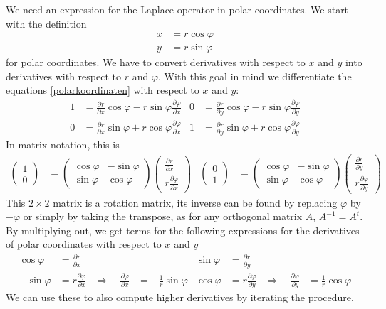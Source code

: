 We need an expression for the Laplace operator in polar coordinates.
We start with the definition
\begin{align}
x&=r\cos\varphi\\
y&=r\sin\varphi
\label{polarkoordinaten}
\end{align}
for polar coordinates.
We have to convert derivatives with respect to $x$ and $y$
into derivatives with respect to $r$ and $\varphi$.
With this goal in mind we differentiate the equations
\eqref{polarkoordinaten} with respect to $x$ and $y$:
\begin{align*}
1&=
\frac{\partial r}{\partial x}\cos\varphi
-r\sin\varphi \frac{\partial\varphi}{\partial x}
&
0&=
\frac{\partial r}{\partial y}\cos\varphi
-r\sin\varphi \frac{\partial\varphi}{\partial y}
\\
0&=
\frac{\partial r}{\partial x}\sin\varphi
+r\cos\varphi \frac{\partial\varphi}{\partial x}
&
1&=
\frac{\partial r}{\partial y}\sin\varphi
+r\cos\varphi \frac{\partial\varphi}{\partial y}
\end{align*}
In matrix notation, this is
\begin{align*}
\begin{pmatrix}1\\0\end{pmatrix}
&=
\begin{pmatrix}
\cos\varphi&-\sin\varphi\\
\sin\varphi&\cos\varphi
\end{pmatrix}
\begin{pmatrix}
\frac{\partial r}{\partial x}\\
r\frac{\partial \varphi}{\partial x}
\end{pmatrix}
&
\begin{pmatrix}0\\1\end{pmatrix}
&=
\begin{pmatrix}
\cos\varphi&-\sin\varphi\\
\sin\varphi&\cos\varphi
\end{pmatrix}
\begin{pmatrix}
\frac{\partial r}{\partial y}\\
r\frac{\partial \varphi}{\partial y}
\end{pmatrix}
\end{align*}
This 
$2\times2$ matrix is a rotation matrix, its inverse can be found
by replacing $\varphi$ by $-\varphi$ or simply by taking the
transpose, as for any orthogonal matrix $A$, $A^{-1}=A^t$.
By multiplying out, we get terms for the following expressions for
the derivatives of polar coordinates with respect to $x$ and $y$
\begin{align*}
\cos\varphi
&=\frac{\partial r}{\partial x}
&&
&
\sin\varphi
&=
\frac{\partial r}{\partial y}
&&
\\
-\sin\varphi
&=r\frac{\partial \varphi}{\partial x}
&\Rightarrow\quad
\frac{\partial\varphi}{\partial x}&=-\frac1r\sin\varphi
&
\cos\varphi
&=
r\frac{\partial\varphi}{\partial y}
&\Rightarrow\quad
\frac{\partial\varphi}{\partial y}&=\frac1r\cos\varphi
\end{align*}
We can use these to also compute higher derivatives by
iterating the procedure.

